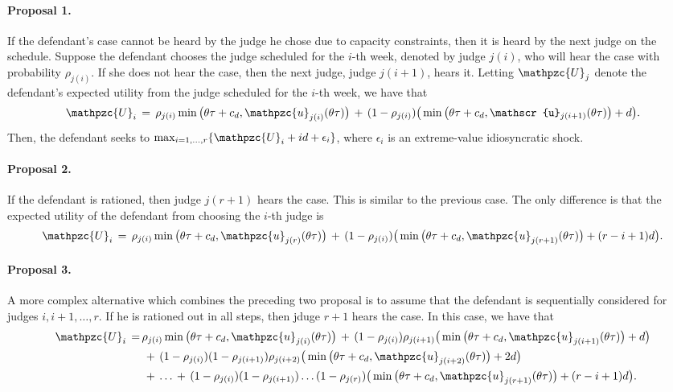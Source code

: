 \documentclass[11pt, oneside]{article}   	%
\theoremstyle{ModifiedStyle}
\begin{document}
\paragraph{Proposal 1.} If the defendant's case cannot be heard by the judge he chose due to capacity constraints, then it is heard by the next judge on the schedule. Suppose the defendant chooses the judge scheduled for the $i$-th week, denoted by judge $j(i)$, who will hear the case with probability $\rho_{j(i)}$. If she does not hear the case, then the next judge, judge $j(i+1)$, hears it. Letting $\mathpzc{U}_j$ denote the defendant's expected utility from the judge scheduled for the $i$-th week, we have that
\begin{align*}
	\mathpzc{U}_i \,=\, \rho_{j(i)} \min \big( \theta\tau+c_d , \mathpzc{u}_{j(i)}(\theta\tau) \big) \,+\, (1-\rho_{j(i)}) \big( \min \big( \theta\tau+c_d , \mathscr{u}_{j(i+1)}(\theta\tau) \big) + d \big).
\end{align*}
Then, the defendant seeks to $\max_{i=1,\ldots,r} \{\mathpzc{U}_i+i d + \epsilon_i\}$, where $\epsilon_i$ is an extreme-value idiosyncratic shock.
%
\vspace{-3mm}
\paragraph{Proposal 2.} If the defendant is rationed, then judge $j(r+1)$ hears the case. This is similar to the previous case. The only difference is that the expected utility of the defendant from choosing the $i$-th judge is 
\begin{align*}
	\mathpzc{U}_i \,=\, \rho_{j(i)} \min \big( \theta\tau+c_d , \mathpzc{u}_{j(r)}(\theta\tau) \big) \,+\, (1-\rho_{j(i)}) \big( \min \big( \theta\tau+c_d , \mathpzc{u}_{j(r+1)}(\theta\tau) \big) + (r-i+1)d \big).
\end{align*}
%
\vspace{-10mm}
\paragraph{Proposal 3.} A more complex alternative which combines the preceding two proposal is to assume that the defendant is sequentially considered for judges $i,i+1,\ldots,r$. If he is rationed out in all steps, then jduge $r+1$ hears the case. In this case, we have that 
\begin{align*}
	\mathpzc{U}_i \,=\, &\rho_{j(i)} \min \big( \theta\tau+c_d , \mathpzc{u}_{j(i)}(\theta\tau) \big) \,+\, (1-\rho_{j(i)}) \rho_{j(i+1)} \big( \min \big( \theta\tau+c_d , \mathpzc{u}_{j(i+1)}(\theta\tau) \big) + d \big) \\
	&\,+\, (1-\rho_{j(i)})(1-\rho_{j(i+1)})\rho_{j(i+2)} \big( \min \big( \theta\tau+c_d , \mathpzc{u}_{j(i+2)}(\theta\tau) \big) + 2d \big) \\
	&\,+\,\ldots\,+\,(1-\rho_{j(i)})(1-\rho_{j(i+1)})\ldots(1-\rho_{j(r)}) \big( \min \big( \theta\tau+c_d , \mathpzc{u}_{j(r+1)}(\theta\tau) \big) + (r-i+1)d \big).
\end{align*}
%
\vspace{-7mm}
\end{document}
